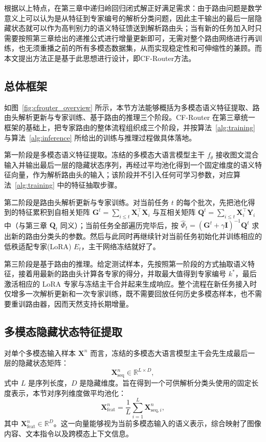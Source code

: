 根据以上特点，在第三章中递归岭回归闭式解正好满足需求：由于路由问题是数学意义上可以认为是从特征到专家编号的解析分类问题，因此主干输出的最后一层隐藏状态就可以作为高判别力的语义特征馈送到解析路由头；当有新的任务加入时只需要按照第三章给出的递推公式进行增量更新即可，无需对整个路由网络进行再训练，也无须重播之前的所有多模态数据集，从而实现稳定性和可伸缩性的兼顾。而本文提出方法正是基于此思想进行设计，即CF-Router方法。

\subsection{总体框架}

如图~\ref{fig:cfrouter_overview} 所示，本节方法能够概括为多模态语义特征提取、路由头解析更新与专家训练、基于路由的推理三个阶段。CF-Router 在第三章统一框架的基础上，把专家路由的整体流程组织成三个阶段，并按算法~\ref{alg:training} 与算法~\ref{alg:inference} 所给出的训练与推理过程做具体落地。

第一阶段是多模态语义特征提取。冻结的多模态大语言模型主干 $f_{\theta}$ 接收图文混合输入并输出最后一层的隐藏状态序列，再经过平均池化得到一个固定维度的语义特征向量，作为解析路由头的输入；该阶段并不引入任何可学习参数，对应算法~\ref{alg:training} 中的特征抽取步骤。

第二阶段是路由头解析更新与专家训练。对当前任务 $t$ 的每个批次，先把池化得到的特征累积到自相关矩阵 $\mathbf{G}^{t}=\sum_{i\le t}\mathbf{X}_i^{\top}\mathbf{X}_i$ 与互相关矩阵 $\mathbf{Q}^{t}=\sum_{i\le t}\mathbf{X}_i^{\top}\mathbf{Y}_i$ 中（与第三章 $\mathbf{Q}_t$ 同义）；当前任务全部遍历完毕后，按 $\widehat{\Phi}_t=(\mathbf{G}^{t}+\gamma\mathbf{I})^{-1}\mathbf{Q}^{t}$ 求出新的路由分类头的参数。然后与此同时再继续针对当前任务初始化并训练相应的低秩适配专家(LoRA) $E_t$，主干网络冻结就好了。

第三阶段是基于路由的推理。给定测试样本，先按照第一阶段的方式抽取语义特征，接着用最新的路由头计算各专家的得分，并取最大值得到专家编号 $k^{*}$，最后激活相应的 LoRA 专家与冻结主干合并起来生成响应。整个流程在新任务接入时仅增多一次解析更新和一次专家训练，既不需要回放任何历史多模态样本，也不需要重训路由器，因而天然支持长期增量。

\subsection{多模态隐藏状态特征提取}

对单个多模态输入样本 $\mathbf{X}^{n}$ 而言，冻结的多模态大语言模型主干会先生成最后一层的隐藏状态矩阵：
\begin{equation}
\mathbf{X}_{\mathrm{seq}}^{n} \in \mathbb{R}^{L \times D},
\end{equation}
式中 $L$ 是序列长度，$D$ 是隐藏维度。旨在得到一个可供解析分类头使用的固定长度表示，本节对序列维度做平均池化：
\begin{equation}
\mathbf{X}_{\mathrm{feat}}^{n}=\frac{1}{L}\sum_{i=1}^{L}\mathbf{X}_{\mathrm{seq},i}^{n},
\label{eq:cfrouter_pool}
\end{equation}
其中 $\mathbf{X}_{\mathrm{feat}}^{n} \in \mathbb{R}^{D}$。这一向量能够视为当前多模态输入的语义表示，综合映射了图像内容、文本指令以及跨模态上下文信息。

